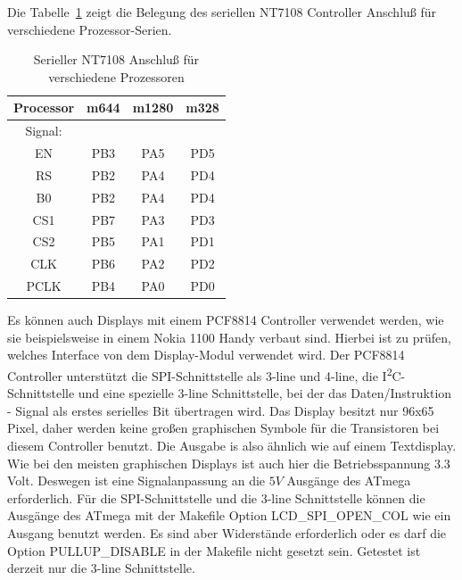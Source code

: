 Die Tabelle~\ref{tab:7108-processor} zeigt die Belegung des seriellen NT7108 Controller
Anschluß für verschiedene Prozessor-Serien.
\begin{table}[H]
  \begin{center}
    \begin{tabular}{| c || c | c | c |}
    \hline
 Processor  & m644  &  m1280  & m328 \\
    \hline
    \hline
Signal:     &       &        &         \\
  EN        &  PB3  &  PA5   & PD5     \\
    \hline
  RS        &  PB2  &  PA4   & PD4      \\
  B0        &  PB2  &  PA4   & PD4      \\
    \hline
  CS1       &  PB7  &  PA3   & PD3      \\
    \hline
  CS2       &  PB5  &  PA1   & PD1      \\
    \hline
  CLK       &  PB6  &  PA2   & PD2      \\
    \hline
  PCLK      &  PB4  &  PA0   & PD0      \\
    \hline
    \end{tabular}
  \end{center}
  \caption{Serieller NT7108 Anschluß für verschiedene Prozessoren}
\label{tab:7108-processor}
\end{table}

Es können auch Displays mit einem PCF8814 Controller verwendet werden, wie sie beispielsweise
in einem Nokia 1100 Handy verbaut sind. Hierbei ist zu prüfen, welches Interface von dem Display-Modul
verwendet wird. Der PCF8814 Controller unterstützt die SPI-Schnittstelle als 3-line und 4-line,
die I\textsuperscript{2}C-Schnittstelle und eine spezielle 3-line Schnittstelle, bei der das
Daten/Instruktion - Signal als erstes serielles Bit übertragen wird.
Das Display besitzt nur 96x65 Pixel, daher werden keine großen graphischen Symbole für die
Transistoren bei diesem Controller benutzt. Die Ausgabe is also ähnlich wie auf einem Textdisplay.
Wie bei den meisten graphischen Displays ist auch hier die Betriebsspannung 3.3 Volt.
Deswegen ist eine Signalanpassung an die \(5V\) Ausgänge des ATmega erforderlich.
Für die SPI-Schnittstelle und die 3-line Schnittstelle können die Ausgänge des ATmega
mit der Makefile Option LCD\_SPI\_OPEN\_COL wie ein  Ausgang benutzt werden.
Es sind aber  Widerstände erforderlich oder es darf die Option PULLUP\_DISABLE
in der Makefile nicht gesetzt sein.
Getestet ist derzeit nur die 3-line Schnittstelle.

